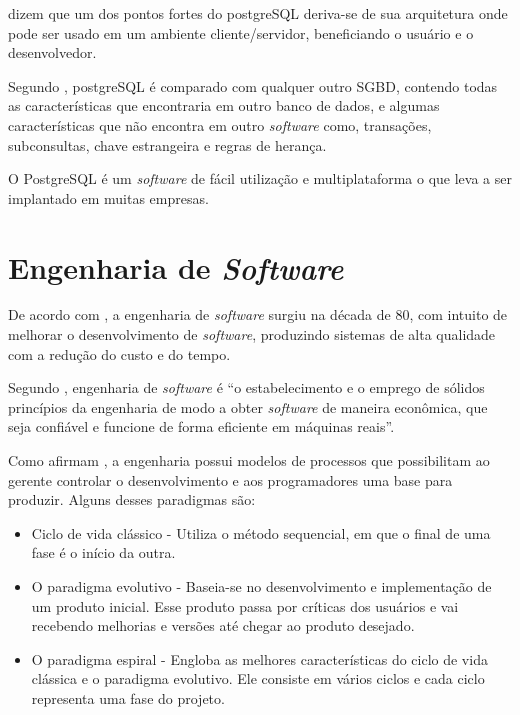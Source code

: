 	\par {}  dizem que um dos pontos fortes do
postgreSQL deriva-se de sua arquitetura onde pode ser usado em um ambiente
cliente/servidor, beneficiando o usuário e o desenvolvedor.

	\par Segundo , postgreSQL é comparado com
qualquer outro SGBD, contendo todas as características que encontraria em outro
banco de dados, e algumas características que não encontra em outro
\textit{software} como, transações, subconsultas, chave estrangeira e regras de
herança.

	\par O PostgreSQL é um \textit{software} de fácil utilização e multiplataforma
o que leva a ser implantado em muitas empresas.


\section{Engenharia de \textit{Software}}

	\par De acordo com , a engenharia de \textit{software}
surgiu na década de 80, com intuito de melhorar o desenvolvimento de
\textit{software}, produzindo sistemas de alta qualidade com a redução do custo
e do tempo.

	\par Segundo , engenharia de \textit{software} é
“o estabelecimento e o emprego de sólidos princípios da engenharia de modo a
obter \textit{software} de maneira econômica, que seja confiável e funcione de
forma eficiente em máquinas reais”.

	\par Como afirmam , a engenharia possui modelos de
processos que possibilitam ao gerente controlar o desenvolvimento e aos
programadores uma base para produzir. Alguns desses paradigmas são:

	\begin{itemize}
	  
	  \item Ciclo de vida clássico - Utiliza o método sequencial, em que o final
	  de uma fase é o início da outra.
	  
	  \item O paradigma evolutivo - Baseia-se no desenvolvimento e implementação
	  de um produto inicial. Esse produto passa por críticas dos usuários e vai
	  recebendo melhorias e versões até chegar ao produto desejado.
	  
	  \item O paradigma espiral - Engloba as melhores características do ciclo de
	  vida clássica e o paradigma evolutivo. Ele consiste em vários ciclos e cada
	  ciclo representa uma fase do projeto.
	
	\end{itemize}



